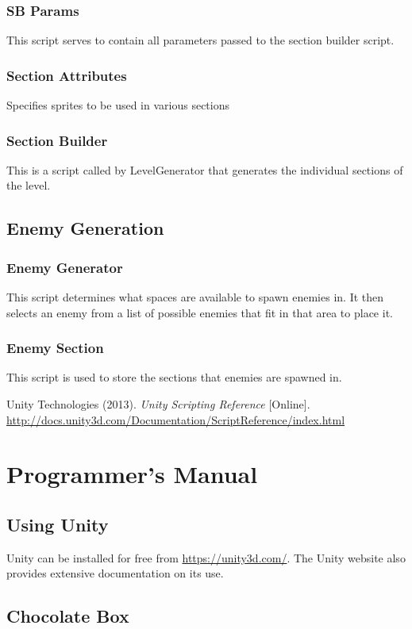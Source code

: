 \documentclass[pdftex,12pt,letter]{article}
\begin{document}
\subsubsection{SB Params}
This script serves to contain all parameters passed to the section builder script.
\subsubsection{Section Attributes}
Specifies sprites to be used in various sections
\subsubsection{Section Builder}
This is a script called by LevelGenerator that generates the individual sections of the level.
\subsection{Enemy Generation}
\subsubsection{Enemy Generator}
This script determines what spaces are available to spawn enemies in. It then selects an enemy from a list of possible enemies that fit in that area to place it.
\subsubsection{Enemy Section}
This script is used to store the sections that enemies are spawned in.

\begin{thebibliography}{3}
Unity Technologies (2013). \textit{Unity Scripting Reference} [Online]. \url{http://docs.unity3d.com/Documentation/ScriptReference/index.html}
\end{thebibliography}

\newpage
\appendix
\section{Programmer's Manual}
\subsection{Using Unity}
Unity can be installed for free from \url{https://unity3d.com/}. The Unity website also provides extensive documentation on its use.
\subsection{Chocolate Box}
\end{document}

